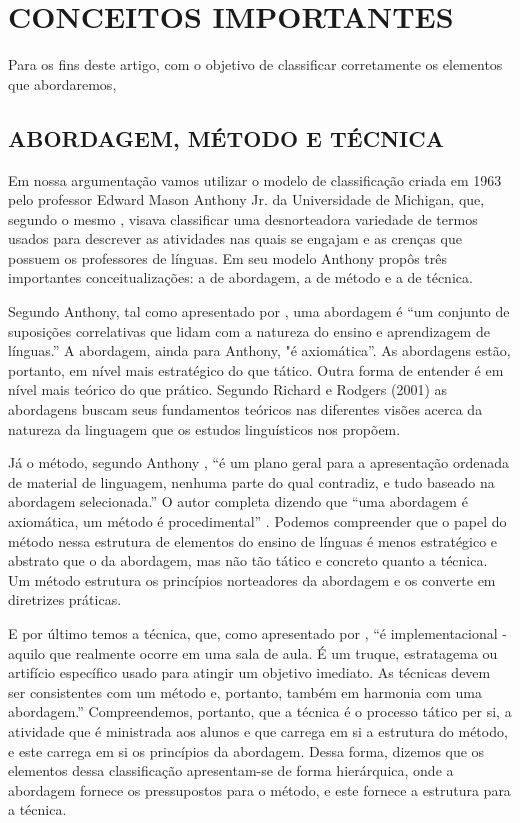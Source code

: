 \section{CONCEITOS IMPORTANTES}

Para os fins deste artigo, com o objetivo de classificar corretamente os elementos que abordaremos,

\subsection{ABORDAGEM, MÉTODO E TÉCNICA}

Em nossa argumentação vamos utilizar o modelo de classificação criada em 1963 pelo professor Edward Mason Anthony Jr. da Universidade de Michigan, que, segundo o mesmo \cite{richards2001}, visava classificar uma desnorteadora variedade de termos usados para descrever as atividades nas quais se engajam e as crenças que possuem os professores de línguas. Em seu modelo Anthony propôs três importantes conceitualizações: a de abordagem, a de método e a de técnica.

Segundo Anthony, tal como apresentado por , uma abordagem é “um conjunto de suposições correlativas que lidam com a natureza do ensino e aprendizagem de línguas.” A abordagem, ainda para Anthony, "é axiomática”. As abordagens estão, portanto, em nível mais estratégico do que tático. Outra forma de entender é em nível mais teórico do que prático. Segundo Richard e Rodgers (2001) as abordagens buscam seus fundamentos teóricos nas diferentes visões acerca da natureza da linguagem que os estudos linguísticos nos propõem.

Já o método, segundo Anthony \cite{richards2001}, “é um plano geral para a apresentação ordenada de material de linguagem, nenhuma parte do qual contradiz, e tudo baseado na abordagem selecionada.” O autor completa dizendo que “uma abordagem é axiomática, um método é procedimental” \cite{richards2001}. Podemos compreender que o papel do método nessa estrutura de elementos do ensino de línguas é menos estratégico e abstrato que o da abordagem, mas não tão tático e concreto quanto a técnica. Um método estrutura os princípios norteadores da abordagem e os converte em diretrizes práticas. 

E por último temos a técnica, que, como apresentado por , “é implementacional - aquilo que realmente ocorre em uma sala de aula. É um truque, estratagema ou artifício específico usado para atingir um objetivo imediato. As técnicas devem ser consistentes com um método e, portanto, também em harmonia com uma abordagem.” Compreendemos, portanto, que a técnica é o processo tático per si, a atividade que é ministrada aos alunos e que carrega em si a estrutura do método, e este carrega em si os princípios da abordagem. Dessa forma, dizemos que os elementos dessa classificação apresentam-se de forma hierárquica, onde a abordagem fornece os pressupostos para o método, e este fornece a estrutura para a técnica.


